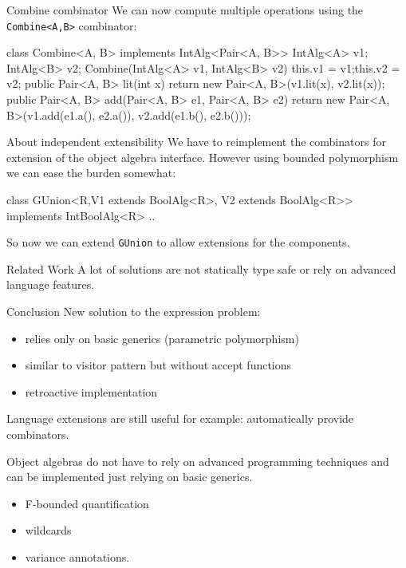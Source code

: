 \documentclass[10pt, compress]{beamer}
\newcommand{\inlinecode}[2]{\colorbox{backg}{\scriptsize{\texttt{#2}}}}
\newenvironment{slide}[1]{\begin{frame}[fragile,environment=slide]{#1}}{\end{frame}}
\newenvironment{slide}[2]{\begin{frame}[fragile,environment=slide]{#1}{#2}}{\end{frame}}
\begin{document}
\begin{slide}{Combine combinator}
We can now compute multiple operations using the \inlinecode{java}{Combine<A,B>} combinator:
\begin{java}
class Combine<A, B> implements IntAlg<Pair<A, B>> {
  IntAlg<A> v1;
  IntAlg<B> v2;
  Combine(IntAlg<A> v1, IntAlg<B> v2) { this.v1 = v1;this.v2 = v2; }
  public Pair<A, B> lit(int x) {
    return new Pair<A, B>(v1.lit(x), v2.lit(x));
  }
  public Pair<A, B> add(Pair<A, B> e1, Pair<A, B> e2) {
    return new Pair<A, B>(v1.add(e1.a(), e2.a()), v2.add(e1.b(), e2.b()));
  }
}
\end{java} 
\end{slide}
\begin{slide}{About independent extensibility}
We have to reimplement the combinators for extension of the object algebra interface.
However using bounded polymorphism we can ease the burden somewhat:
\begin{java}
class GUnion<R,V1 extends BoolAlg<R>, V2 extends BoolAlg<R>> implements IntBoolAlg<R> {
  ..
}
\end{java}
So now we can extend \inlinecode{java}{GUnion} to allow extensions for the components.
\end{slide}

\begin{slide}{Related Work}
A lot of solutions are not statically type safe or rely on advanced language features.
\end{slide}

\begin{slide}{Conclusion}
New solution to the expression problem:
\begin{itemize}
\item relies only on basic generics (parametric polymorphism)
\item similar to visitor pattern but without accept functions
\item retroactive implementation
\end{itemize}
Language extensions are still useful
for example: automatically provide combinators.
\end{slide}



\begin{slide}
Object algebras do not have to rely on advanced programming techniques and can be implemented just relying on basic generics.
  \begin{itemize}
    \item F-bounded quantification
    \item wildcards
    \item variance annotations.
  \end{itemize}
\end{slide}
\end{document}
